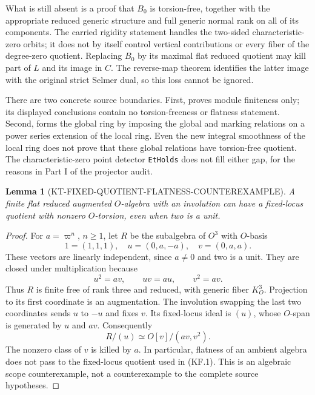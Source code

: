 \documentclass[11pt,a4paper]{article}
\newtheorem{lemma}[theorem]{Lemma}
\theoremstyle{definition}
\begin{document}
What is still absent is a proof that $B_0$ is
torsion-free, together with the appropriate reduced
generic structure and full generic normal rank on all
of its components.  The carried rigidity statement
handles the two-sided characteristic-zero orbits; it
does not by itself control vertical contributions or
every fiber of the degree-zero quotient.  Replacing
$B_0$ by its maximal flat reduced quotient may kill
part of $L$ and its image in $C$.  The reverse-map
theorem identifies the latter image with the original
strict Selmer dual, so this loss cannot be ignored.

There are two concrete source boundaries.  First,
 proves
module finiteness only; its displayed conclusions
contain no torsion-freeness or flatness statement.
Second,  forms the
global ring by imposing the global and marking
relations on a power series extension of the local
ring.  Even the new integral smoothness of the local
ring does not prove that these global relations have
torsion-free quotient.  The characteristic-zero
point detector \texttt{EtHolds} does not fill either
gap, for the reasons in Part I of the projector audit.

\begin{lemma}[KT-FIXED-QUOTIENT-FLATNESS-COUNTEREXAMPLE]
A finite flat reduced augmented $O$-algebra with an
involution can have a fixed-locus quotient with
nonzero $O$-torsion, even when two is a unit.
\end{lemma}
\begin{proof}
For $a=\varpi^n$, $n\geq1$, let $R$ be the subalgebra
of $O^3$ with $O$-basis
\[
  1=(1,1,1),\quad u=(0,a,-a),\quad v=(0,a,a).
                                                                  \tag{KF.4}
\]
These vectors are linearly independent, since $a\ne0$
and two is a unit.  They are closed under
multiplication because
\[
                u^2=av,\qquad uv=au,\qquad v^2=av.          \tag{KF.5}
\]
Thus $R$ is finite free of rank three and reduced,
with generic fiber $K_O^3$.  Projection to its first
coordinate is an augmentation.  The involution
swapping the last two coordinates sends $u$ to
$-u$ and fixes $v$.  Its fixed-locus ideal is $(u)$,
whose $O$-span is generated by $u$ and $av$.
Consequently
\[
                  R/(u)\simeq O[v]/(av,v^2).               \tag{KF.6}
\]
The nonzero class of $v$ is killed by $a$.  In
particular, flatness of an ambient algebra does not
pass to the fixed-locus quotient used in (KF.1).
This is an algebraic scope counterexample, not a
counterexample to the complete source hypotheses.
\end{proof}
\end{document}
